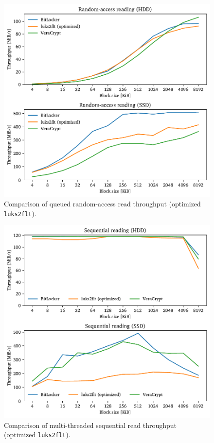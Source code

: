 \begin{figure}[htb!]
	\center
	\includegraphics[scale=1]{../fig/performance.results.optrandqueue.pdf}
	\caption[
		Comparison of queued random-access read throughput (optimized \texttt{luks2flt})
	]{
		Comparison of queued random-access read throughput (optimized \texttt{luks2flt}). 
	}
	\label{fig:performance.results.optrandqueue}
\end{figure}

\begin{figure}[htb!]
	\center
	\includegraphics[scale=1]{../fig/performance.results.optseqthreads.pdf}
	\caption[
		Comparison of multi-threaded sequential read throughput (optimized \texttt{luks2flt})
	]{
		Comparison of multi-threaded sequential read throughput (optimized \texttt{luks2flt}). 
	}
	\label{fig:performance.results.optseqthreads}
\end{figure}

